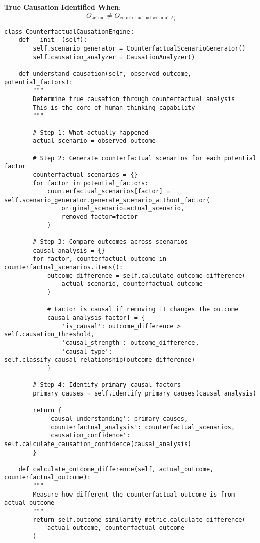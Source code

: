 \documentclass[12pt,a4paper]{article}
\begin{document}
\textbf{True Causation Identified When}:
$$O_{\text{actual}} \neq O_{\text{counterfactual without } F_i}$$

\begin{lstlisting}[style=pythonstyle, caption=Counterfactual Causation Analysis Engine]
class CounterfactualCausationEngine:
    def __init__(self):
        self.scenario_generator = CounterfactualScenarioGenerator()
        self.causation_analyzer = CausationAnalyzer()
        
    def understand_causation(self, observed_outcome, potential_factors):
        """
        Determine true causation through counterfactual analysis
        This is the core of human thinking capability
        """
        
        # Step 1: What actually happened
        actual_scenario = observed_outcome
        
        # Step 2: Generate counterfactual scenarios for each potential factor
        counterfactual_scenarios = {}
        for factor in potential_factors:
            counterfactual_scenarios[factor] = self.scenario_generator.generate_scenario_without_factor(
                original_scenario=actual_scenario,
                removed_factor=factor
            )
        
        # Step 3: Compare outcomes across scenarios
        causal_analysis = {}
        for factor, counterfactual_outcome in counterfactual_scenarios.items():
            outcome_difference = self.calculate_outcome_difference(
                actual_scenario, counterfactual_outcome
            )
            
            # Factor is causal if removing it changes the outcome
            causal_analysis[factor] = {
                'is_causal': outcome_difference > self.causation_threshold,
                'causal_strength': outcome_difference,
                'causal_type': self.classify_causal_relationship(outcome_difference)
            }
        
        # Step 4: Identify primary causal factors
        primary_causes = self.identify_primary_causes(causal_analysis)
        
        return {
            'causal_understanding': primary_causes,
            'counterfactual_analysis': counterfactual_scenarios,
            'causation_confidence': self.calculate_causation_confidence(causal_analysis)
        }
        
    def calculate_outcome_difference(self, actual_outcome, counterfactual_outcome):
        """
        Measure how different the counterfactual outcome is from actual outcome
        """
        return self.outcome_similarity_metric.calculate_difference(
            actual_outcome, counterfactual_outcome
        )
\end{lstlisting}
\end{document}
